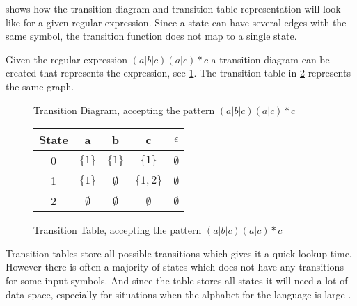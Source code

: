  shows how the transition diagram and transition table
representation will look like for a given regular expression. Since a state can
have several edges with the same symbol, the transition function does not map to
a single state.
\newline
\begin{example} \label{regexp2td}
Given the regular expression $(a|b|c)(a|c)* c$ a transition diagram can be
created that represents the expression, see \cref{fig:td}. The transition table
in \cref{fig:tt} represents the same graph.

\begin{figure}[h!]
  \centering
  \caption{Transition Diagram, accepting the pattern $(a|b|c)(a|c)* c$
  \label{fig:td}}
\end{figure}

\begin{figure}[h!]
  \centering
  \begin{tabular}{| c | c c c c |}
    \hline
    \hline
    State & a & b & c & $\epsilon$\\
    \hline
    0 & $\{1\}$ & $\{1\}$ & $\{1\}$ & $\emptyset$ \\
    1 & $\{1\}$ & $\emptyset$ & $\{1,2\}$ & $\emptyset$ \\
    2 & $\emptyset$ & $\emptyset$ & $\emptyset$ & $\emptyset$ \\
    \hline
  \end{tabular}
  \caption{Transition Table, accepting the pattern $(a|b|c)(a|c)* c$
  \label{fig:tt}}
\end{figure}
\end{example}

Transition tables store all possible transitions which gives it a quick lookup
time. However there is often a majority of states which does not have any
transitions for some input symbols. And since the table stores all states it
will need a lot of data space, especially for situations when the alphabet for
the language is large \cite{Aho2006}.

